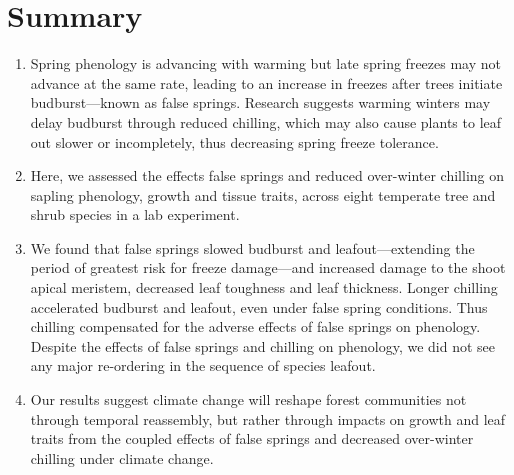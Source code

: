 \documentclass{article}\usepackage[]{graphicx}\usepackage[]{color}
\begin{document}
\section*{Summary} %
\begin{enumerate}
\item Spring phenology is advancing with warming but late spring freezes may not advance at the same rate, leading to an increase in freezes after trees initiate budburst---known as false springs. Research suggests warming winters may delay budburst through reduced chilling, which may also cause plants to leaf out slower or incompletely, thus decreasing spring freeze tolerance. 
\item Here, we assessed the effects false springs and reduced over-winter chilling on sapling phenology, growth and tissue traits, across eight temperate tree and shrub species in a lab experiment. 
\item We found that false springs slowed budburst and leafout---extending the period of greatest risk for freeze damage---and increased damage to the shoot apical meristem, decreased leaf toughness and leaf thickness. Longer chilling accelerated budburst and leafout, even under false spring conditions. Thus chilling compensated for the adverse effects of false springs on phenology. Despite the effects of false springs and chilling on phenology, we did not see any major re-ordering in the sequence of species leafout.
\item Our results suggest climate change will reshape forest communities not through temporal reassembly, but rather through impacts on growth and leaf traits from the coupled effects of false springs and decreased over-winter chilling under climate change.
\end{enumerate}

\end{document}
